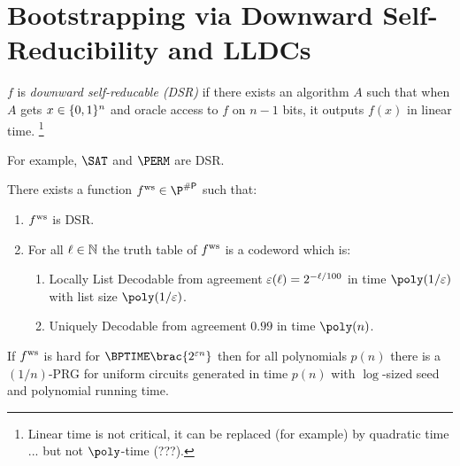 \section{Bootstrapping via Downward Self-Reducibility and LLDCs}

\begin{definition}
  $f$ is \emph{downward self-reducable (DSR)} if there exists an algorithm $A$
  such that when $A$ gets $x \in \{0, 1\}^n$ and oracle access to $f$ on $n -
  1$ bits, it outputs $f(x)$ in linear time.%
  \footnote{Linear time is not critical, it can be replaced (for example) by
	quadratic time ... but not $\poly$-time (???).}
\end{definition}

For example, $\SAT$ and $\PERM$ are DSR.

\begin{proposition}
  There exists a function $\fws \in \P^{\sharpp}$ such that:
  \begin{enumerate}
    \item $ f^{\text{ws}} $ is DSR.
    \item For all $\ell \in \mathbb{N}$ the truth table of $ f^{\text{ws}} $ is a codeword
      which is:
      \begin{enumerate}
        \item Locally List Decodable from agreement $\varepsilon(\ell) = 2^{-\ell /
          100}$ in time $\poly(1/\eps)$ with list size $\poly(1 / \eps)$.
        \item Uniquely Decodable from agreement $0.99$ in time $\poly(n)$.
      \end{enumerate}
  \end{enumerate}
\end{proposition}

\begin{theorem}\label{thm:uniform-hard-random-sharpP}
  If $ f^{\text{ws}} $ is hard for $\BPTIME\brac{2^{\eps n}}$ then for all polynomials
  $p(n)$ there is a $(1 / n)$-PRG for uniform circuits generated in time $p(n)$
  with $\log$-sized seed and polynomial running time.
\end{theorem}

